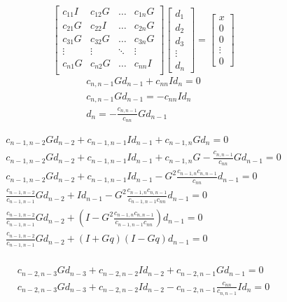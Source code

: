 \documentclass[]{article}
\begin{document}
	\begin{equation}
		\begin{bmatrix}
			c_{11}I & c_{12}G & \ldots & c_{1n}G\\
			c_{21}G & c_{22}I & \ldots & c_{2n}G\\
			c_{31}G& c_{32}G & \ldots & c_{3n}G\\
			\vdots & \vdots  & \ddots & \vdots \\
			c_{n1}G & c_{n2}G & \ldots & c_{nn}I\\
		\end{bmatrix}
		\begin{bmatrix}
			d_1\\d_2\\d_3\\\vdots\\d_n
		\end{bmatrix}
		=
		\begin{bmatrix}
			x\\0\\0\\\vdots\\0
		\end{bmatrix}
	\end{equation}
	\begin{align}
	c_{n,n-1}Gd_{n-1} + c_{nn}Id_n = 0\\
	c_{n,n-1}Gd_{n-1} = -c_{nn}Id_n \\
	d_n = -\frac{c_{n,n-1}}{c_{nn}}Gd_{n-1}
	\end{align}

	\begin{align}
	c_{n-1,n-2}Gd_{n-2}  + c_{n-1,n-1}Id_{n-1} + c_{n-1,n}Gd_n = 0\\
	c_{n-1,n-2}Gd_{n-2}  + c_{n-1,n-1}Id_{n-1} + c_{n-1,n}G-\frac{c_{n,n-1}}{c_{nn}}Gd_{n-1} = 0\\
	c_{n-1,n-2}Gd_{n-2}  + c_{n-1,n-1}Id_{n-1} - G^2\frac{c_{n-1,n}c_{n,n-1}}{c_{nn}}d_{n-1} = 0\\
	\frac{c_{n-1,n-2}}{c_{n-1,n-1}}Gd_{n-2}  + Id_{n-1} - G^2\frac{c_{n-1,n}c_{n,n-1}}{c_{n-1,n-1}c_{nn}}d_{n-1} = 0\\
	\frac{c_{n-1,n-2}}{c_{n-1,n-1}}Gd_{n-2}  + \left(I - G^2\frac{c_{n-1,n}c_{n,n-1}}{c_{n-1,n-1}c_{nn}}\right)d_{n-1} = 0\\
	\frac{c_{n-1,n-2}}{c_{n-1,n-1}}Gd_{n-2}  + \left(I + Gq\right)\left(I - Gq\right)d_{n-1} = 0\\
	\end{align}

	\begin{align}
	c_{n-2,n-3}Gd_{n-3}  + c_{n-2,n-2}Id_{n-2} + c_{n-2,n-1}Gd_{n-1} = 0\\
	c_{n-2,n-3}Gd_{n-3}  + c_{n-2,n-2}Id_{n-2} - c_{n-2,n-1} \frac{c_{nn}}{c_{n,n-1}}Id_n = 0\\
	\end{align}


\end{document}
